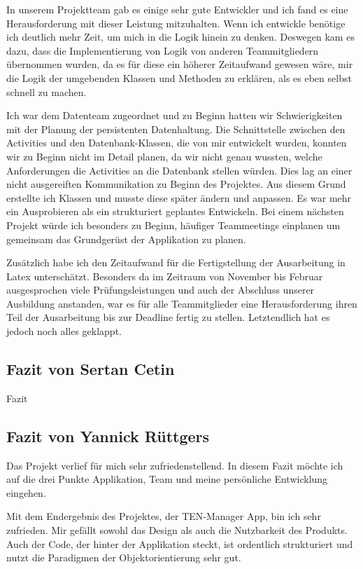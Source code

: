 In unserem Projektteam gab es einige sehr gute Entwickler und ich fand es eine Herausforderung mit dieser Leistung mitzuhalten. Wenn ich entwickle benötige ich deutlich mehr Zeit, um mich in die Logik hinein zu denken. Deswegen kam es dazu, dass die Implementierung von Logik von anderen Teammitgliedern übernommen wurden, da es für diese ein höherer Zeitaufwand gewesen wäre, mir die Logik der umgebenden Klassen und Methoden zu erklären, als es eben selbst schnell zu machen.

Ich war dem Datenteam zugeordnet und zu Beginn hatten wir Schwierigkeiten mit der Planung der persistenten Datenhaltung. Die Schnittstelle zwischen den Activities und den Datenbank-Klassen, die von mir entwickelt wurden, konnten wir zu Beginn nicht im Detail planen, da wir nicht genau wussten, welche Anforderungen die Activities an die Datenbank stellen würden. Dies lag an einer nicht ausgereiften Kommunikation zu Beginn des Projektes. Aus diesem Grund erstellte ich Klassen und musste diese später ändern und anpassen. Es war mehr ein Ausprobieren als ein strukturiert geplantes Entwickeln. Bei einem nächsten Projekt würde ich besonders zu Beginn, häufiger Teammeetings einplanen um gemeinsam das Grundgerüst der Applikation zu planen.

Zusätzlich habe ich den Zeitaufwand für die Fertigstellung der Ausarbeitung in Latex unterschätzt. Besonders da im Zeitraum von November bis Februar ausgesprochen viele Prüfungsleistungen und auch der Abschluss unserer Ausbildung anstanden, war es für alle Teammitglieder eine Herausforderung ihren Teil der Ausarbeitung bis zur Deadline fertig zu stellen. Letztendlich hat es jedoch noch alles geklappt.


\subsection{Fazit von Sertan Cetin}

Fazit

\subsection{Fazit von Yannick Rüttgers}

Das Projekt verlief für mich sehr zufriedenstellend. In diesem Fazit möchte ich auf die drei Punkte Applikation, Team und meine persönliche Entwicklung eingehen.

Mit dem Endergebnis des Projektes, der TEN-Manager App, bin ich sehr zufrieden. Mir gefällt sowohl das Design als auch die Nutzbarkeit des Produkts. Auch der Code, der hinter der Applikation steckt, ist ordentlich strukturiert und nutzt die Paradigmen der Objektorientierung sehr gut.

